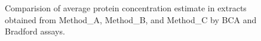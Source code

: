 \documentclass[
  letterpaper,
  DIV=11,
  numbers=noendperiod]{scrreprt}
\begin{document}
\begin{figure}[H]


\caption{\label{fig-proteinesti}Comparision of average protein
concentration estimate in extracts obtained from Method\_A, Method\_B,
and Method\_C by BCA and Bradford assays.}

\end{figure}%
\end{document}
